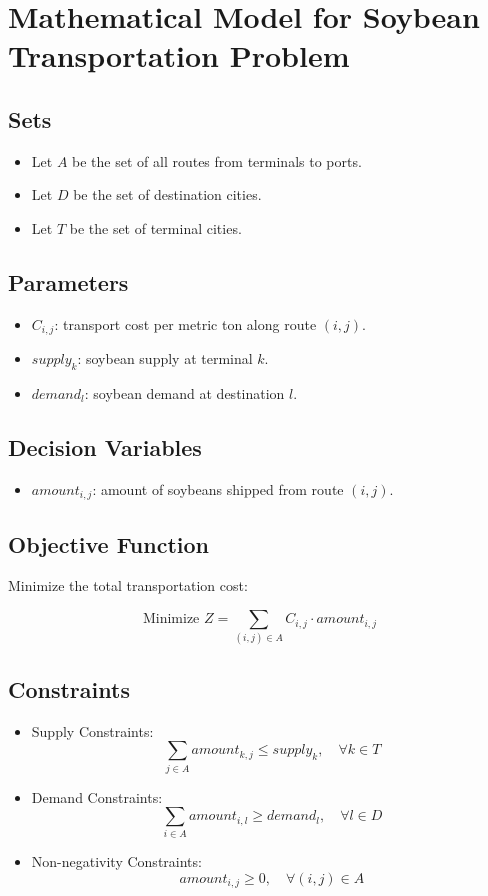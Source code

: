 \documentclass{article}
\begin{document}
\section*{Mathematical Model for Soybean Transportation Problem}

\subsection*{Sets}
\begin{itemize}
    \item Let \( A \) be the set of all routes from terminals to ports.
    \item Let \( D \) be the set of destination cities.
    \item Let \( T \) be the set of terminal cities.
\end{itemize}

\subsection*{Parameters}
\begin{itemize}
    \item \( C_{i,j} \): transport cost per metric ton along route \( (i,j) \).
    \item \( supply_{k} \): soybean supply at terminal \( k \).
    \item \( demand_{l} \): soybean demand at destination \( l \).
\end{itemize}

\subsection*{Decision Variables}
\begin{itemize}
    \item \( amount_{i,j} \): amount of soybeans shipped from route \( (i,j) \).
\end{itemize}

\subsection*{Objective Function}
Minimize the total transportation cost:

\[
\text{Minimize } Z = \sum_{(i,j) \in A} C_{i,j} \cdot amount_{i,j}
\]

\subsection*{Constraints}
\begin{itemize}
    \item Supply Constraints:
    \[
    \sum_{j \in A} amount_{k,j} \leq supply_{k}, \quad \forall k \in T
    \]
    
    \item Demand Constraints:
    \[
    \sum_{i \in A} amount_{i,l} \geq demand_{l}, \quad \forall l \in D
    \]
    
    \item Non-negativity Constraints:
    \[
    amount_{i,j} \geq 0, \quad \forall (i,j) \in A
    \]
\end{itemize}
\end{document}

